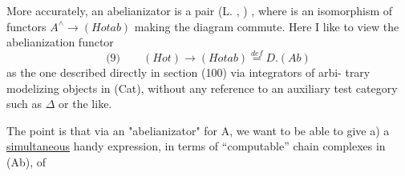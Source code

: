More accurately,  an abelianizator is a pair (L. ,\hand{$\lambda$} ) ,  where \hand{$\lambda$} is an
isomorphism of functors   $A^{\wedge} \longrightarrow (Hotab)$  making the diagram commute.
Here  I like to view the abelianization functor
\[ \text{(9)} \qquad (Hot) \longrightarrow (Hotab) \overset{def}{=} D.(Ab) \]
as the one described directly in section (100) via integrators of arbi-%
trary modelizing objects in (Cat),  without any reference to an auxiliary
test category such as $\Delta$ or the like. \hand{$\rfloor\!\lceil$}

The point is that  via an
"abelianizator" for A,  we want to be able to give  a)  a \uline{simultaneous}
handy expression,  in terms of ``computable'' chain complexes in (Ab),  of

